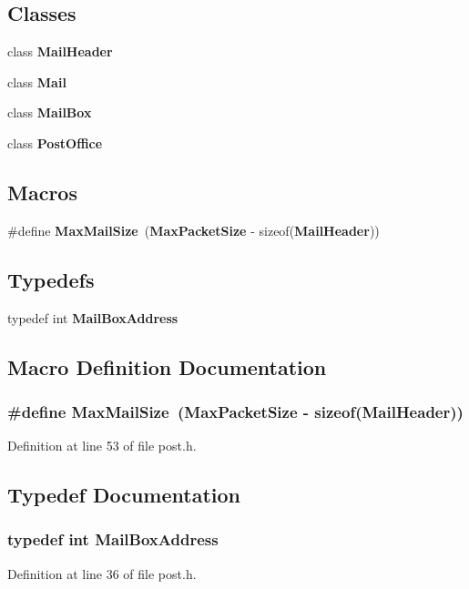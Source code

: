 \subsection*{Classes}
\begin{DoxyCompactItemize}
\item 
class {\bf Mail\+Header}
\item 
class {\bf Mail}
\item 
class {\bf Mail\+Box}
\item 
class {\bf Post\+Office}
\end{DoxyCompactItemize}
\subsection*{Macros}
\begin{DoxyCompactItemize}
\item 
\#define {\bf Max\+Mail\+Size}~({\bf Max\+Packet\+Size} -\/ sizeof({\bf Mail\+Header}))
\end{DoxyCompactItemize}
\subsection*{Typedefs}
\begin{DoxyCompactItemize}
\item 
typedef int {\bf Mail\+Box\+Address}
\end{DoxyCompactItemize}


\subsection{Macro Definition Documentation}
\subsubsection[{Max\+Mail\+Size}]{\setlength{\rightskip}{0pt plus 5cm}\#define Max\+Mail\+Size~({\bf Max\+Packet\+Size} -\/ sizeof({\bf Mail\+Header}))}\label{post_8h_acac72c11b8afb730eea510dfe7794190}


Definition at line 53 of file post.\+h.



\subsection{Typedef Documentation}
\subsubsection[{Mail\+Box\+Address}]{\setlength{\rightskip}{0pt plus 5cm}typedef int {\bf Mail\+Box\+Address}}\label{post_8h_a31c331a795c220e45bac3b9697a19629}


Definition at line 36 of file post.\+h.


